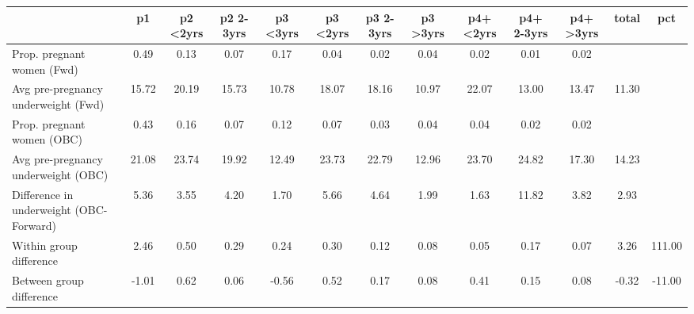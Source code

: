 \begin{tabular}{l*{12}{c}}
\toprule
            &\multicolumn{1}{c}{p1}&\multicolumn{1}{c}{p2 \textless2yrs}&\multicolumn{1}{c}{p2 2-3yrs}&\multicolumn{1}{c}{p3 \textless3yrs}&\multicolumn{1}{c}{p3 <2yrs}&\multicolumn{1}{c}{p3 2-3yrs}&\multicolumn{1}{c}{p3 >3yrs}&\multicolumn{1}{c}{p4+ <2yrs}&\multicolumn{1}{c}{p4+ 2-3yrs}&\multicolumn{1}{c}{p4+ >3yrs}&\multicolumn{1}{c}{total}&\multicolumn{1}{c}{pct}\\
\midrule
\midrule
Prop. pregnant women (Fwd)&        0.49&        0.13&        0.07&        0.17&        0.04&        0.02&        0.04&        0.02&        0.01&        0.02&            &            \\
Avg pre-pregnancy underweight (Fwd)&       15.72&       20.19&       15.73&       10.78&       18.07&       18.16&       10.97&       22.07&       13.00&       13.47&       11.30&            \\
Prop. pregnant women (OBC)&        0.43&        0.16&        0.07&        0.12&        0.07&        0.03&        0.04&        0.04&        0.02&        0.02&            &            \\
Avg pre-pregnancy underweight (OBC)&       21.08&       23.74&       19.92&       12.49&       23.73&       22.79&       12.96&       23.70&       24.82&       17.30&       14.23&            \\
Difference in underweight (OBC-Forward)&        5.36&        3.55&        4.20&        1.70&        5.66&        4.64&        1.99&        1.63&       11.82&        3.82&        2.93&            \\
Within group difference&        2.46&        0.50&        0.29&        0.24&        0.30&        0.12&        0.08&        0.05&        0.17&        0.07&        3.26&      111.00\\
Between group difference&       -1.01&        0.62&        0.06&       -0.56&        0.52&        0.17&        0.08&        0.41&        0.15&        0.08&       -0.32&      -11.00\\
\bottomrule
\end{tabular}
